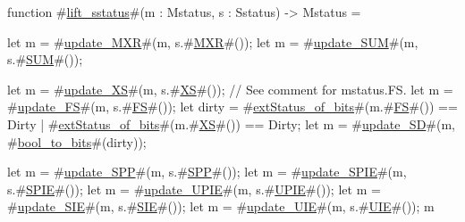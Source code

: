 function #\hyperref[sailRISCVzliftzysstatus]{lift\_sstatus}#(m : Mstatus, s : Sstatus) -> Mstatus = {
  let m = #\hyperref[sailRISCVzupdatezyMXR]{update\_MXR}#(m, s.#\hyperref[sailRISCVzMXR]{MXR}#());
  let m = #\hyperref[sailRISCVzupdatezySUM]{update\_SUM}#(m, s.#\hyperref[sailRISCVzSUM]{SUM}#());

  let m = #\hyperref[sailRISCVzupdatezyXS]{update\_XS}#(m, s.#\hyperref[sailRISCVzXS]{XS}#());
  // See comment for mstatus.FS.
  let m = #\hyperref[sailRISCVzupdatezyFS]{update\_FS}#(m, s.#\hyperref[sailRISCVzFS]{FS}#());
  let dirty = #\hyperref[sailRISCVzextStatuszyofzybits]{extStatus\_of\_bits}#(m.#\hyperref[sailRISCVzFS]{FS}#()) == Dirty | #\hyperref[sailRISCVzextStatuszyofzybits]{extStatus\_of\_bits}#(m.#\hyperref[sailRISCVzXS]{XS}#()) == Dirty;
  let m = #\hyperref[sailRISCVzupdatezySD]{update\_SD}#(m, #\hyperref[sailRISCVzboolzytozybits]{bool\_to\_bits}#(dirty));

  let m = #\hyperref[sailRISCVzupdatezySPP]{update\_SPP}#(m, s.#\hyperref[sailRISCVzSPP]{SPP}#());
  let m = #\hyperref[sailRISCVzupdatezySPIE]{update\_SPIE}#(m, s.#\hyperref[sailRISCVzSPIE]{SPIE}#());
  let m = #\hyperref[sailRISCVzupdatezyUPIE]{update\_UPIE}#(m, s.#\hyperref[sailRISCVzUPIE]{UPIE}#());
  let m = #\hyperref[sailRISCVzupdatezySIE]{update\_SIE}#(m, s.#\hyperref[sailRISCVzSIE]{SIE}#());
  let m = #\hyperref[sailRISCVzupdatezyUIE]{update\_UIE}#(m, s.#\hyperref[sailRISCVzUIE]{UIE}#());
  m
}
